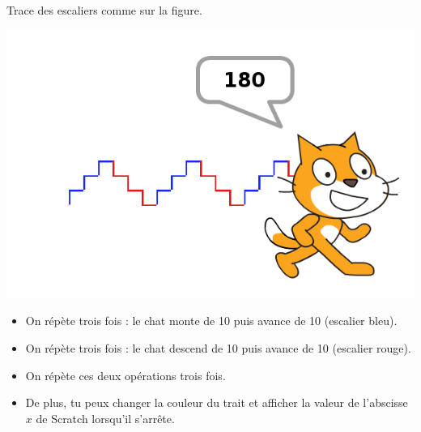 \documentclass[class=report,crop=false, 12pt]{standalone}
\begin{document}
\begin{activite}
Trace des escaliers comme sur la figure.
\begin{center}
  \includegraphics[scale=\scaleecran]{ecran-02-ex3}   
\end{center}

\begin{itemize}
  \item On répète trois fois : le chat monte de 10 puis avance de  10 (escalier bleu).
  \item On répète trois fois  : le chat descend de 10 puis avance de  10  (escalier rouge).
  \item On répète ces deux opérations trois fois.
  \item De plus, tu peux changer la couleur du trait et afficher la valeur de l'abscisse $x$ de Scratch lorsqu'il s'arrête.
\end{itemize}
\end{activite}
\end{document}
